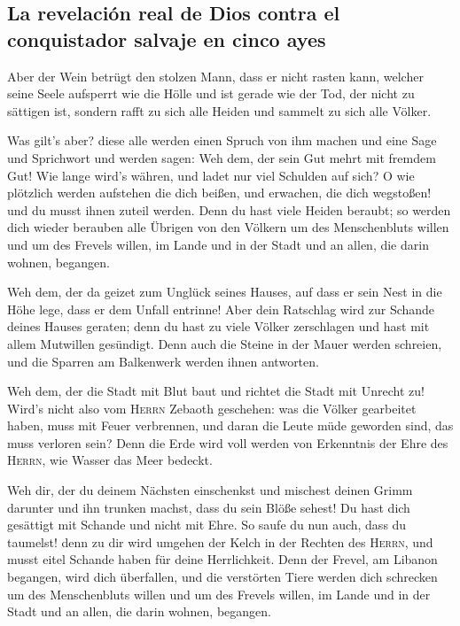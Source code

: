 \hypertarget{la-revelaciuxf3n-real-de-dios-contra-el-conquistador-salvaje-en-cinco-ayes}{%
\subsection{La revelación real de Dios contra el conquistador salvaje en
cinco
ayes}\label{la-revelaciuxf3n-real-de-dios-contra-el-conquistador-salvaje-en-cinco-ayes}}

 Aber der Wein betrügt den stolzen Mann, dass er nicht
rasten kann, welcher seine Seele aufsperrt wie die Hölle und ist gerade
wie der Tod, der nicht zu sättigen ist, sondern rafft zu sich alle
Heiden und sammelt zu sich alle Völker.

 Was gilt's aber? diese alle werden einen Spruch von ihm
machen und eine Sage und Sprichwort und werden sagen: Weh dem, der sein
Gut mehrt mit fremdem Gut! Wie lange wird's währen, und ladet nur viel
Schulden auf sich?  O wie plötzlich werden aufstehen die
dich beißen, und erwachen, die dich wegstoßen! und du musst ihnen zuteil
werden.  Denn du hast viele Heiden beraubt; so werden dich
wieder berauben alle Übrigen von den Völkern um des Menschenbluts willen
und um des Frevels willen, im Lande und in der Stadt und an allen, die
darin wohnen, begangen.

 Weh dem, der da geizet zum Unglück seines Hauses, auf
dass er sein Nest in die Höhe lege, dass er dem Unfall entrinne!
 Aber dein Ratschlag wird zur Schande deines Hauses
geraten; denn du hast zu viele Völker zerschlagen und hast mit allem
Mutwillen gesündigt.  Denn auch die Steine in der Mauer
werden schreien, und die Sparren am Balkenwerk werden ihnen antworten.

 Weh dem, der die Stadt mit Blut baut und richtet die
Stadt mit Unrecht zu!  Wird's nicht also vom
\textsc{Herrn} Zebaoth geschehen: was die Völker gearbeitet haben, muss
mit Feuer verbrennen, und daran die Leute müde geworden sind, das muss
verloren sein?  Denn die Erde wird voll werden von
Erkenntnis der Ehre des \textsc{Herrn}, wie Wasser das Meer bedeckt.

 Weh dir, der du deinem Nächsten einschenkst und mischest
deinen Grimm darunter und ihn trunken machst, dass du sein Blöße sehest!
 Du hast dich gesättigt mit Schande und nicht mit Ehre.
So saufe du nun auch, dass du taumelst! denn zu dir wird umgehen der
Kelch in der Rechten des \textsc{Herrn}, und musst eitel Schande haben
für deine Herrlichkeit.  Denn der Frevel, am Libanon
begangen, wird dich überfallen, und die verstörten Tiere werden dich
schrecken um des Menschenbluts willen und um des Frevels willen, im
Lande und in der Stadt und an allen, die darin wohnen, begangen.

